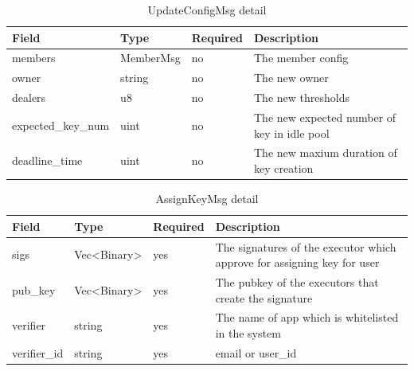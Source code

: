 \documentclass[../Main.tex]{subfiles}
\begin{document}
\begin{table}[H]
  \centering
  \begin{tabular}{|l|l|l|p{8cm}|}
\hline
\rowcolor[HTML]{F56B00} 
\textbf{Field}                  & \textbf{Type} & \textbf{Required} & \textbf{Description}                        \\ \hline
\cellcolor[HTML]{FFFFFF}members & MemberMsg     & no                & The member config                           \\ \hline
owner                           & string        & no                & The new owner                               \\ \hline
dealers                         & u8            & no                & The new thresholds                          \\ \hline
expected\_key\_num              & uint          & no                & The new expected number of key in idle pool \\ \hline
deadline\_time                  & uint          & no                & The new maxium duration of key creation     \\ \hline
\end{tabular}
  \caption{UpdateConfigMsg detail}
  \label{updateconfig-msg-detail}
\end{table}

\begin{table}[H]
  \centering
  \begin{tabular}{|l|l|l|p{8cm}|}
\hline
\rowcolor[HTML]{F56B00} 
\textbf{Field}               & \textbf{Type}                      & \textbf{Required} & \textbf{Description}                                                    \\ \hline
\cellcolor[HTML]{FFFFFF}sigs & Vec\textless{}Binary\textgreater{} & yes               & The signatures of the executor which approve for assigning key for user \\ \hline
pub\_key                     & Vec\textless{}Binary\textgreater{} & yes               & The pubkey of the executors that create the signature                   \\ \hline
verifier                     & string                             & yes               & The name of app which is whitelisted in the system                      \\ \hline
verifier\_id                 & string                             & yes               & email or user\_id                                                       \\ \hline
\end{tabular}
  \caption{AssignKeyMsg detail}
  \label{assignkey-msg-detail}
\end{table}
\end{document}

